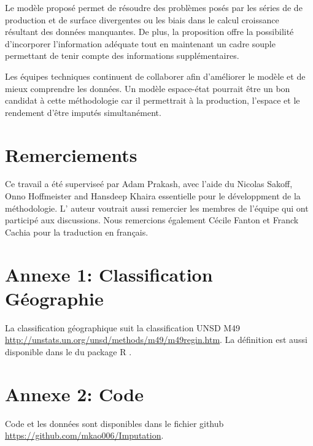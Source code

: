 \documentclass[nojss]{jss}\usepackage{graphicx, color}
\begin{document}
Le mod\`{e}le propos\'{e} permet de r\'{e}soudre des probl\`{e}mes
pos\'{e}s par les s\'{e}ries de de production et de surface
divergentes ou les biais dans le calcul croissance r\'{e}sultant des
donn\'{e}es manquantes. De plus, la proposition offre la
possibilit\'{e} d'incorporer l'information ad\'{e}quate tout en
maintenant un cadre souple permettant de tenir compte des informations
suppl\'{e}mentaires.

Les \'{e}quipes techniques continuent de collaborer afin
d'am\'{e}liorer le mod\`{e}le et de mieux comprendre les
donn\'{e}es. Un mod\`{e}le espace-\'{e}tat pourrait \^{e}tre un bon
candidat \`{a} cette m\'{e}thodologie car il permettrait \`{a} la
production, l'espace et le rendement d'\^{e}tre imput\'{e}s
simultan\'{e}ment.


\section*{Remerciements}
Ce travail a \'{e}t\'{e} supervise\'{e} par Adam Prakash, avec l'aide
du Nicolas Sakoff, Onno Hoffmeister and Hansdeep Khaira essentielle
pour le d\'{e}veloppment de la m\'{e}thodologie. L' auteur voutrait
aussi remercier les membres de l'\'{e}quipe qui ont particip\'{e} aux
discussions. Nous remercions \'{e}galement C\'{e}cile Fanton et Franck
Cachia pour la traduction en fran\c{c}ais.


\newpage
\section*{Annexe 1: Classification G\'{e}ographie}

La classification g\'{e}ographique suit la classification UNSD M49
\url{http://unstats.un.org/unsd/methods/m49/m49regin.htm}. La
d\'{e}finition est aussi disponible dans le  du
package R .


\section*{Annexe 2: Code}


Code et les donn\'{e}es sont disponibles dans le fichier github
\url{https://github.com/mkao006/Imputation}.
\end{document}
